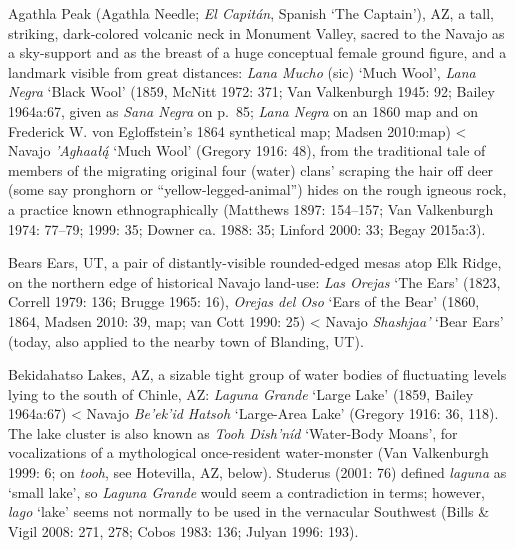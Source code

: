 Agathla Peak (Agathla Needle; \textit{El Capitán}, Spanish ‘The Captain’), AZ, a tall, striking, dark-colored volcanic neck in Monument Valley, sacred to the Navajo as a sky-support and as the breast of a huge conceptual female ground figure, and a landmark visible from great distances:  \textit{Lana Mucho} (sic) ‘Much Wool’, \textit{Lana Negra} ‘Black Wool’ (1859, McNitt 1972: 371; Van Valkenburgh 1945: 92; Bailey 1964a:67, given as \textit{Sana Negra} on p.\ 85; \textit{Lana Negra} on an 1860 map and on Frederick W. von Egloffstein’s 1864 synthetical map; Madsen 2010:map) {\textless} Navajo \textit{’Aghaał\'{ą}} ‘Much Wool’ (Gregory 1916: 48), from the traditional tale of members of the migrating original four (water) clans’ scraping the hair off deer (some say pronghorn or “yellow-legged-animal”) hides on the rough igneous rock, a practice known ethnographically (Matthews 1897: 154–157; Van Valkenburgh 1974: 77–79; 1999: 35; Downer ca. 1988: 35; Linford 2000: 33; Begay 2015a:3).

Bears Ears, UT, a pair of distantly-visible rounded-edged mesas atop Elk Ridge, on the northern edge of historical Navajo land-use:  \textit{Las Orejas} ‘The Ears’ (1823, Correll 1979: 136; Brugge 1965: 16), \textit{Orejas del Oso} ‘Ears of the Bear’ (1860, 1864, Madsen 2010: 39, map; van Cott 1990: 25) {\textless} Navajo \textit{Shashjaa’} ‘Bear Ears’ (today, also applied to the nearby town of Blanding, UT).

Bekidahatso Lakes, AZ, a sizable tight group of water bodies of fluctuating levels lying to the south of Chinle, AZ:  \textit{Laguna Grande }‘Large Lake’ (1859, Bailey 1964a:67) {\textless} Navajo \textit{Be’ek’id Hatsoh} ‘Large-Area Lake’ (Gregory 1916: 36, 118).  The lake cluster is also known as \textit{Tooh Dish’níd} ‘Water-Body Moans’, for vocalizations of a mythological once-resident water-monster (Van Valkenburgh 1999: 6; on \textit{tooh}, see Hotevilla, AZ, below).  Studerus (2001: 76) defined \textit{laguna} as ‘small lake’, so \textit{Laguna Grande }would seem a contradiction in terms; however, \textit{lago} ‘lake’ seems not normally to be used in the vernacular Southwest (Bills \& Vigil 2008: 271, 278; Cobos 1983: 136; Julyan 1996: 193).

